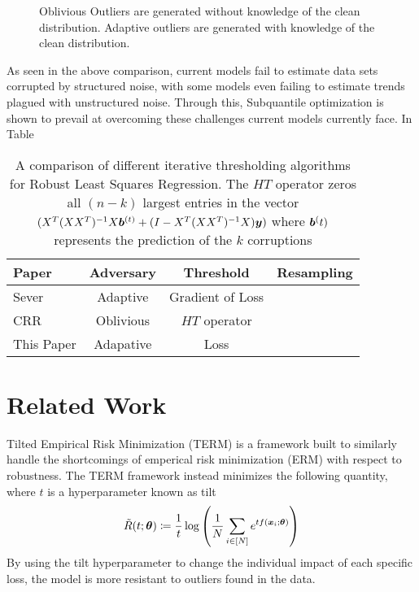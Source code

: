 \documentclass{article} %
\newcommand{\cmark}{\ding{51}}%
\newcommand{\xmark}{\ding{55}}%
\begin{document}
\begin{figure}[!t]
		\caption{Oblivious Outliers are generated without knowledge of the clean distribution. Adaptive outliers are generated with knowledge of the clean distribution.}
		\label{fig:structure-unstructured-noise}
	\end{figure}
	
	As seen in the above comparison, current models fail to estimate data sets corrupted by structured noise, with some models even failing to estimate trends plagued with unstructured noise. Through this, Subquantile optimization is shown to prevail at overcoming these challenges current models currently face. In Table 
	
	\begin{table}[!h]
		\centering
		\begin{tabular}{lccc}
			\toprule 
			Paper & Adversary & Threshold & Resampling\\   
			\midrule                
			Sever \cite{DiakonikolasKKLSS19} & Adaptive & Gradient of Loss & \xmark \\
			\midrule
			CRR \cite{bhatia2017} & Oblivious & $HT$ operator &\checkmark\\
			\midrule 
			This Paper & Adapative & Loss & \cmark\\
			\bottomrule
		\end{tabular}
		\caption{A comparison of different iterative thresholding algorithms for Robust Least Squares Regression. The $HT$ operator zeros all $(n-k)$ largest entries in the vector $(X^T(X X^T)^{-1}X{\bm{b}}^{(t)} + (I - X^T(X X^T)^{-1}X){\bm{y}})$ where ${\bm{b}}^(t)$ represents the prediction of the $k$ corruptions}
		\label{tab:related-work}
	\end{table}
	
	\section{Related Work}
	
	Tilted Empirical Risk Minimization (TERM) \cite{li2020tilted} is a framework built to similarly handle the shortcomings of emperical risk minimization (ERM) with respect to robustness. The TERM framework instead minimizes the following quantity, where $t$ is a hyperparameter known as tilt
	\begin{equation}
		\tilde{R}(t;{\bm{\theta}}) \coloneqq \frac{1}{t} \log\left(\frac{1}{N}\sum_{i \in \left[N\right]}e^{tf({\bm{x}}_i;{\bm{\theta}})} \right)
	\end{equation}
	By using the tilt hyperparameter to change the individual impact of each specific loss, the model is more resistant to outliers found in the data.
	
\end{document}
